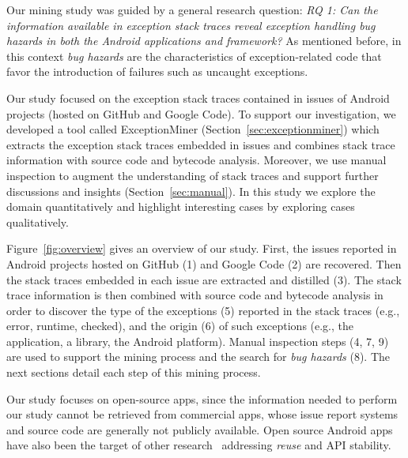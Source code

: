 Our mining study was guided by a general research question: \emph{RQ 1: Can the information available in exception stack traces
 reveal exception handling \emph{bug hazards} in both the Android applications and framework?}
As mentioned before, in this context \emph{bug hazards} are the characteristics of exception-related code
that favor the introduction of failures such as uncaught exceptions.

Our study focused on the exception stack traces contained in issues of Android projects (hosted on GitHub and Google Code).
To support our investigation, we developed a tool called ExceptionMiner (Section~\ref{sec:exceptionminer})
which extracts the exception stack traces embedded in issues
and combines stack trace information with source code and bytecode
analysis. Moreover, we use manual inspection to augment
 the understanding of stack traces and support further discussions and insights (Section~\ref{sec:manual}).
In this study we explore the domain quantitatively and highlight interesting cases by
exploring cases qualitatively.

Figure~\ref{fig:overview} gives an overview of our study.
First,  the issues reported in Android projects hosted on GitHub (1) and Google Code (2) are recovered.
Then the stack traces embedded in each issue are extracted and distilled (3).
The stack trace information is then combined with source code and bytecode analysis in order to discover
the type of the exceptions (5) reported in the stack traces (e.g., error, runtime, checked),
and the origin (6) of such exceptions
(e.g., the application, a library, the Android platform).
Manual inspection steps (4, 7, 9) are used to support the mining process  and
the search for \emph{bug hazards}  (8). The next sections detail each step of this mining process.

Our study focuses on open-source apps, since the information needed to perform our study
cannot be retrieved from commercial apps, whose issue report systems and
source code are generally not publicly available.
Open source Android apps have also been the
target of other research~\cite{Linar13,Ruiz12} addressing \emph{reuse} and API stability.



